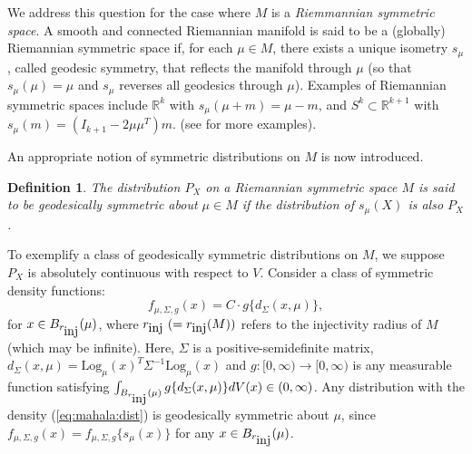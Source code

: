 \documentclass[preprint]{imsart}
\newcommand{\bbR}{\mathbb{R}}
\def\Frechet{Fr\'{e}chet}
\theoremstyle{plain}
\newtheorem{definition}{Definition}
\theoremstyle{remark}
\begin{document}





We address this question for the case where $M$ is a \textit{Riemmannian symmetric space}. A smooth and connected Riemannian manifold is said to be a (globally) Riemannian symmetric space if, for each $\mu \in M$, there exists a unique isometry $s_\mu$, called geodesic symmetry, that reflects the manifold through $\mu$ (so that $s_\mu(\mu) = \mu$ and $s_\mu$ reverses all geodesics through $\mu$). Examples of Riemannian symmetric spaces include $\bbR^k$ with $s_\mu(\mu +m) = \mu -m$, and $S^k \subset \bbR^{k+1}$ with $s_\mu(m) = (I_{k+1} - 2 \mu \mu^T)m$. (see \cite{cornea2017regression} for more examples).%

An appropriate notion of symmetric distributions on $M$ is now introduced.
 
 
\begin{definition}
The distribution $P_{X}$ on a Riemannian symmetric space $M$ is said to be \emph{geodesically symmetric} about $\mu \in M$ if the distribution of $s_\mu (X)$ is also $P_X$.
\end{definition}


To exemplify a class of geodesically symmetric distributions on $M$, we suppose $P_{X}$ is absolutely continuous with respect to $V$. Consider a class of symmetric density functions: 
\begin{equation}\label{eq:mahala:dist} 
f_{\mu, \Sigma, g}(x)= C \cdot g\{d_\Sigma(x,\mu)\},
\end{equation}
for $x \in B_{r_{\mbox{\tiny inj}}}(\mu)$,
where $r_{\mbox{\tiny inj}} ~(=r_{\mbox{\tiny inj}}(M))$ refers to the injectivity radius of $M$ (which may be infinite). 
Here, $\Sigma$ is a positive-semidefinite matrix, $d_\Sigma(x,\mu) = \mbox{Log}_{\mu}(x)^{T}\Sigma^{-1}\mbox{Log}_{\mu}(x)$ and $g:[0, \infty) \rightarrow [0, \infty)$ is any measurable function satisfying $\int_{B_{r_{\mbox{\tiny inj}}}(\mu)} g\{d_\Sigma(x,\mu)\} dV(x) \in (0, \infty)$. Any distribution with the density (\ref{eq:mahala:dist}) is geodesically symmetric about $\mu$, since $f_{\mu, \Sigma, g}(x) = f_{\mu, \Sigma, g}\{s_{\mu}(x)\}$ for any $x \in B_{r_{\mbox{\tiny inj}}}(\mu)$.
\end{document}
